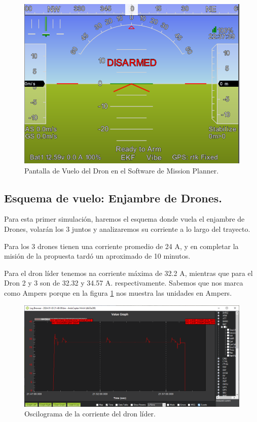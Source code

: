 \begin{figure}[h]
    \centering
    \includegraphics[width=0.8\linewidth]{imagenes/dron_caracteristicas.png}
    \caption{Pantalla de Vuelo del Dron en el Software de Mission Planner.}
    \label{fig:Características del Dron}
\end{figure}

\newpage

\subsection{Esquema de vuelo: Enjambre de Drones.}
Para esta primer simulación, haremos el esquema donde vuela el enjambre de Drones, volarán los 3 juntos y analizaremos su corriente a lo largo del trayecto.

Para los 3 drones tienen una corriente promedio de 24 A, y en completar la misión de la propuesta tardó un aproximado de 10 minutos.

Para el dron líder tenemos na corriente máxima de 32.2 A, mientras que para el Dron 2 y 3 son de 32.32 y 34.57 A. respectivamente. Sabemos que nos marca como Ampers porque en la figura \ref{fig:Características del Dron} nos muestra las unidades en Ampers.
\begin{figure}[h]

\centering
    \includegraphics[width=\linewidth]{imagenes/dron_lider.png}
    \caption{Oscilograma de la corriente del dron líder.}
    \label{fig:subfig1}
\end{figure}

